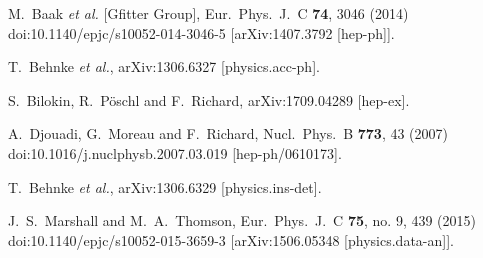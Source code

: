 \documentclass{PoS}
\begin{document}
% 

%

\begin{thebibliography}{99}
M.~Baak {\it et al.} [Gfitter Group],
Eur.\ Phys.\ J.\ C {\bf 74}, 3046 (2014)
doi:10.1140/epjc/s10052-014-3046-5
[arXiv:1407.3792 [hep-ph]].


T.~Behnke {\it et al.},
arXiv:1306.6327 [physics.acc-ph].


S.~Bilokin, R.~Pöschl and F.~Richard,
arXiv:1709.04289 [hep-ex].


A.~Djouadi, G.~Moreau and F.~Richard,
Nucl.\ Phys.\ B {\bf 773}, 43 (2007)
doi:10.1016/j.nuclphysb.2007.03.019
[hep-ph/0610173].


T.~Behnke {\it et al.},
arXiv:1306.6329 [physics.ins-det].


J.~S.~Marshall and M.~A.~Thomson,
Eur.\ Phys.\ J.\ C {\bf 75}, no. 9, 439 (2015)
doi:10.1140/epjc/s10052-015-3659-3
[arXiv:1506.05348 [physics.data-an]].
	
\end{thebibliography}
\end{document}

